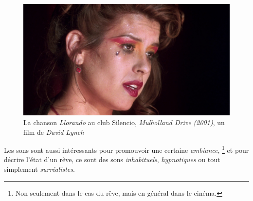 \documentclass[../main.tex]{subfile}
\begin{document}
\begin{figure}
    \centering
    \includegraphics[width=\linewidth]{images/silencio}
    \caption{La chanson \emph{Llorando} au club Silencio, \textit{Mulholland
             Drive (2001)}, un film de \textit{David Lynch}}
    \label{fig:images_silencio}
\end{figure}

Les sons sont aussi intéressants pour promouvoir une certaine \emph{ambiance},
\footnote{Non seulement dans le cas du rêve, mais en général dans le cinéma.} et
pour décrire l'état d'un rêve, ce sont des sons \emph{inhabituels},
\emph{hypnotiques} ou tout simplement \emph{surréalistes}.
\end{document}
